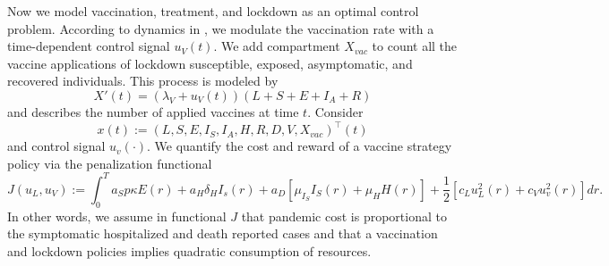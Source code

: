 Now we model vaccination, treatment, and lockdown as an optimal control problem.
According to dynamics in , we modulate the vaccination
rate with a time-dependent control signal  $u_V(t)$. We add
compartment $X_{vac}$
to count all the vaccine applications of lockdown susceptible, exposed,
asymptomatic, and
recovered individuals. This process is modeled by
\begin{equation}
\label{eqn:counter}
  X'(t) =
    (\lambda_V + u_V(t))(L + S + E + I_A + R)
\end{equation}
and describes the number of applied vaccines at time $t$.
Consider
$$x(t):= (L, S, E, I_S, I_A, H, R, D, V, X_{vac})^{\top}(t)$$
and  control signal $u_v(\cdot)$. We quantify the cost and reward of a vaccine
strategy policy via the penalization functional
\begin{equation}
    \label{eqn:cost_functional}
    J(u_L, u_V):=
        \int _0 ^ T
        a_S p \kappa E(r) +
        a_H \delta_H I_s(r) +
        a_D
        \left[
            \mu_{I_S} I_S(r) + \mu_H H(r)
        \right] +
        \frac{1}{2}
        \left[
            c_L u_L^2(r) +
            c_V u_v^2(r)
        \right]
        dr.
\end{equation}
In other words, we assume in functional $J$ that pandemic cost is proportional
to the symptomatic hospitalized and death reported cases and that a vaccination
and lockdown policies implies quadratic consumption of resources.

